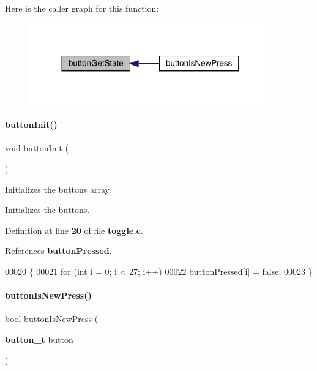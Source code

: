 Here is the caller graph for this function\+:\nopagebreak
\begin{figure}[H]
\begin{center}
\leavevmode
\includegraphics[width=296pt]{toggle_8c_ad2b7c969a01f85d57bdca0bc7f5cff81_icgraph}
\end{center}
\end{figure}
\mbox{\label{toggle_8c_a2b3d226371575c894979ab84bce95626}} 
\paragraph{button\+Init()}
{\footnotesize\ttfamily void button\+Init (\begin{DoxyParamCaption}{ }\end{DoxyParamCaption})}



Initializes the buttons array. 

Initializes the buttons. 

Definition at line \textbf{ 20} of file \textbf{ toggle.\+c}.



References \textbf{ button\+Pressed}.


\begin{DoxyCode}
00020                   \{
00021     \textcolor{keywordflow}{for} (\textcolor{keywordtype}{int} i = 0; i < 27; i++)
00022         buttonPressed[i] = \textcolor{keyword}{false};
00023 \}
\end{DoxyCode}
\mbox{\label{toggle_8c_a07c56bf50097f5bf35c5e8c9067800e1}} 
\paragraph{button\+Is\+New\+Press()}
{\footnotesize\ttfamily bool button\+Is\+New\+Press (\begin{DoxyParamCaption}\item[{\textbf{ button\+\_\+t}}]{button }\end{DoxyParamCaption})}



